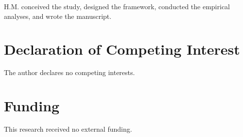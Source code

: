 \documentclass[review]{elsarticle}
\theoremstyle{definition}
\begin{document}
H.M. conceived the study, designed the framework, conducted the empirical analyses, and wrote the manuscript.

\section*{Declaration of Competing Interest}

The author declares no competing interests.

\section*{Funding}

This research received no external funding.



\end{document}
